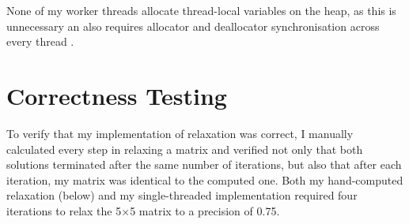 \documentclass[12pt]{article}
\begin{document}
None of my worker threads allocate thread-local variables on the heap, as this is unnecessary an also requires allocator and deallocator synchronisation across every thread \citep{contention}.

\section{Correctness Testing}

To verify that my implementation of relaxation was correct, I manually calculated every step in relaxing a matrix and verified not only that both solutions terminated after the same number of iterations, but also that after each iteration, my matrix was identical to the computed one. Both my hand-computed relaxation (below) and my single-threaded implementation required four iterations to relax the 5$\times$5 matrix to a precision of 0.75.
\end{document}
